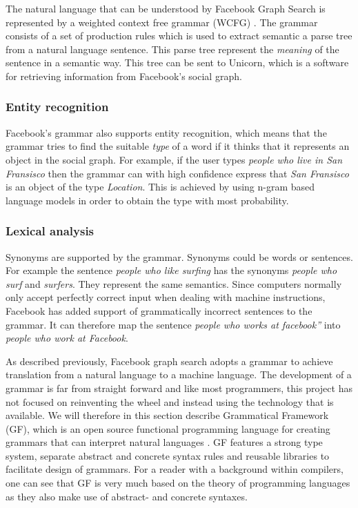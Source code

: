 The natural language that can be understood by Facebook Graph Search is represented by a weighted context free grammar (WCFG) \cite{li:2013}. The grammar consists of a set of production rules which is used to extract semantic a parse tree from a natural language sentence. This parse tree represent the \emph{meaning} of the sentence in a semantic way. This tree can be sent to Unicorn, which is a software for retrieving information from Facebook's social graph.

\subsubsection{Entity recognition}
Facebook's grammar also supports entity recognition, which means that the grammar tries to find the suitable \emph{type} of a word if it thinks that it represents an object in the social graph. For example, if the user types \emph{people who live in San Fransisco} then the grammar can with high confidence express that \emph{San Fransisco} is an object of the type \emph{Location}. This is achieved by using n-gram based language models in order to obtain the type with most probability.

\subsubsection{Lexical analysis}
Synonyms are supported by the grammar. Synonyms could be words or sentences. For example the sentence \emph{people who like surfing} has the synonyms \emph{people who surf} and \emph{surfers}. They represent the same semantics.
\newline
\newline
Since computers normally only accept perfectly correct input when dealing with machine instructions, Facebook has added support of grammatically incorrect sentences to the grammar. It can therefore map the sentence \emph{people who works at facebook”} into \emph{people who work at Facebook}.

As described previously, Facebook graph search adopts a grammar to achieve translation from a natural language to a machine language. The development of a grammar is far from straight forward and like most programmers, this project has not focused on reinventing the wheel and instead using the technology that is available. We will therefore in this section describe Grammatical Framework (GF), which is an open source functional programming language for creating grammars that can interpret natural languages \cite[p. 1]{ranta:2011}. GF features a strong type system, separate abstract and concrete syntax rules and reusable libraries to facilitate design of grammars. For a reader with a background within compilers, one can see that GF is very much based on the theory of programming languages as they also make use of abstract- and concrete syntaxes\cite[pp. 69-70]{Aho:1986:CPT:6448}.

